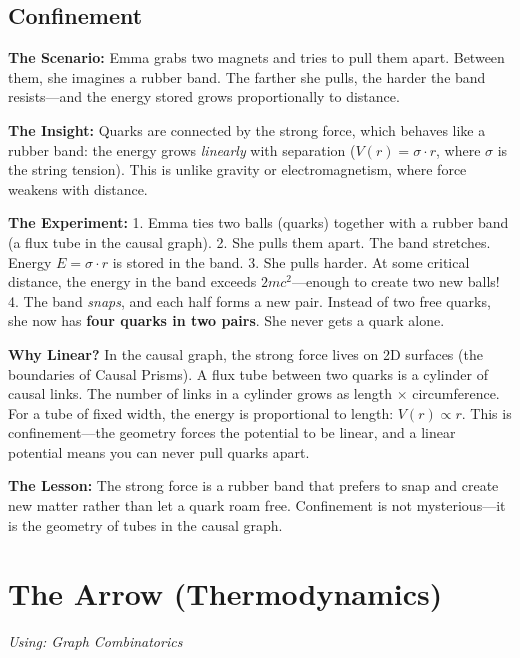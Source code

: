 \documentclass[11pt, a4paper, openany]{book}
\begin{document}
\section{Confinement}
\begin{thoughtexp}
\textbf{The Scenario:} Emma grabs two magnets and tries to pull them apart. Between them, she imagines a rubber band. The farther she pulls, the harder the band resists---and the energy stored grows proportionally to distance.

\textbf{The Insight:} Quarks are connected by the strong force, which behaves like a rubber band: the energy grows \emph{linearly} with separation ($V(r) = \sigma \cdot r$, where $\sigma$ is the string tension). This is unlike gravity or electromagnetism, where force weakens with distance.

\textbf{The Experiment:}
1. Emma ties two balls (quarks) together with a rubber band (a flux tube in the causal graph).
2. She pulls them apart. The band stretches. Energy $E = \sigma \cdot r$ is stored in the band.
3. She pulls harder. At some critical distance, the energy in the band exceeds $2mc^2$---enough to create two new balls!
4. The band \emph{snaps}, and each half forms a new pair. Instead of two free quarks, she now has \textbf{four quarks in two pairs}. She never gets a quark alone.

\textbf{Why Linear?} In the causal graph, the strong force lives on 2D surfaces (the boundaries of Causal Prisms). A flux tube between two quarks is a cylinder of causal links. The number of links in a cylinder grows as length $\times$ circumference. For a tube of fixed width, the energy is proportional to length: $V(r) \propto r$. This is confinement---the geometry forces the potential to be linear, and a linear potential means you can never pull quarks apart.

\textbf{The Lesson:} The strong force is a rubber band that prefers to snap and create new matter rather than let a quark roam free. Confinement is not mysterious---it is the geometry of tubes in the causal graph.
\end{thoughtexp}

\chapter{The Arrow (Thermodynamics)}
\textit{Using: Graph Combinatorics}
\end{document}
